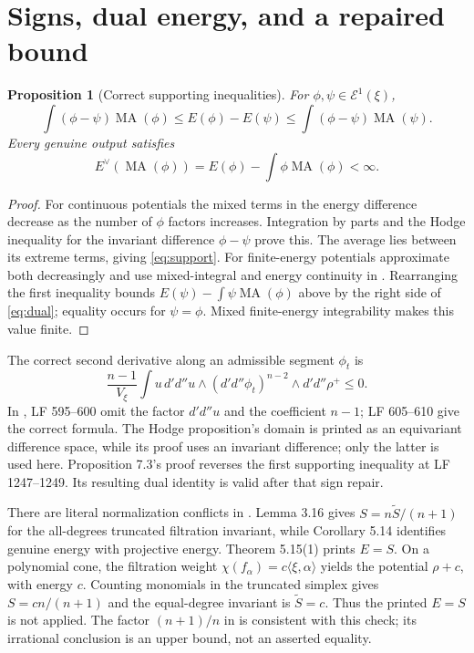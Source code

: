 \documentclass[11pt]{article}
\newcommand{\MA}{\operatorname{MA}}
\newcommand{\EE}{\mathcal E^1}
\newcommand{\dd}{d'd''}
\newtheorem{proposition}{Proposition}
\theoremstyle{remark}
\begin{document}
\section{Signs, dual energy, and a repaired bound}
\begin{proposition}[Correct supporting inequalities]
For $\phi,\psi\in\EE(\xi)$,
\begin{equation}
 \int(\phi-\psi)\MA(\phi)\le E(\phi)-E(\psi)
      \le\int(\phi-\psi)\MA(\psi).\label{eq:support}
\end{equation}
Every genuine output satisfies
\begin{equation}
 E^\vee(\MA(\phi))=E(\phi)-\int\phi\MA(\phi)<\infty.\label{eq:dual}
\end{equation}
\end{proposition}
\begin{proof}
For continuous potentials the mixed terms in the energy difference decrease as the number of $\phi$ factors increases. Integration by parts and the Hodge inequality for the invariant difference $\phi-\psi$ prove this. The average lies between its extreme terms, giving \eqref{eq:support}. For finite-energy potentials approximate both decreasingly and use mixed-integral and energy continuity in \cite[Theorem 6.3]{Wu24}. Rearranging the first inequality bounds $E(\psi)-\int\psi\MA(\phi)$ above by the right side of \eqref{eq:dual}; equality occurs for $\psi=\phi$. Mixed finite-energy integrability makes this value finite.
\end{proof}

The correct second derivative along an admissible segment $\phi_t$ is
\[
 \frac{n-1}{V_\xi}\int u\,\dd u\wedge(\dd\phi_t)^{n-2}\wedge\dd\rho^+\le0.
\]
In \cite{Wu24}, LF 595--600 omit the factor $\dd u$ and the coefficient $n-1$; LF 605--610 give the correct formula. The Hodge proposition's domain is printed as an equivariant difference space, while its proof uses an invariant difference; only the latter is used here. Proposition 7.3's proof reverses the first supporting inequality at LF 1247--1249. Its resulting dual identity is valid after that sign repair.

There are literal normalization conflicts in \cite{Wu21}. Lemma 3.16 gives $S=n\widetilde S/(n+1)$ for the all-degrees truncated filtration invariant, while Corollary 5.14 identifies genuine energy with projective energy. Theorem 5.15(1) prints $E=S$. On a polynomial cone, the filtration weight $\chi(f_\alpha)=c\langle\xi,\alpha\rangle$ yields the potential $\rho+c$, with energy $c$. Counting monomials in the truncated simplex gives $S=cn/(n+1)$ and the equal-degree invariant is $\widetilde S=c$. Thus the printed $E=S$ is not applied. The factor $(n+1)/n$ in \cite[Proposition 7.4]{Wu24} is consistent with this check; its irrational conclusion is an upper bound, not an asserted equality.
\end{document}
